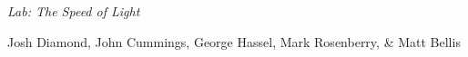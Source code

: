 {\LARGE {\em \noindent Lab: The Speed of Light}}

\large{\noindent Josh Diamond,  John Cummings, George Hassel, Mark Rosenberry, \& Matt Bellis}
